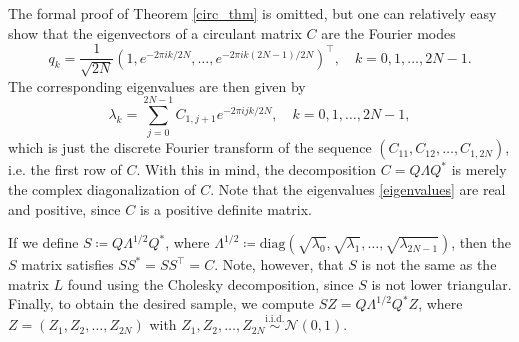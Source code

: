 The formal proof of Theorem \ref{circ_thm} is omitted, but one can relatively easy show that the eigenvectors of a circulant matrix $C$ are the Fourier modes
\begin{equation}
    q_{k}=\frac{1}{\sqrt{2N}}\left(1,e^{-2\pi ik /2N},\dots,e^{-2\pi ik(2N-1)/2N}\right)^{\top},\quad k=0,1,\dots,2N-1.
\end{equation}
The corresponding eigenvalues are then given by
\begin{equation}
    \lambda_{k}=\sum_{j=0}^{2N-1}C_{1,j+1}e^{-2\pi ijk/2N}, \quad k=0,1,\dots,2N-1,
\end{equation}
which is just the discrete Fourier transform of the sequence $(C_{11},C_{12},\dots,C_{1,2N})$, i.e. the first row of $C$. With this in mind, the decomposition $C=Q\Lambda Q^{*}$ is merely the complex diagonalization of $C$.
Note that the eigenvalues \eqref{eigenvalues} are real and positive, since $C$ is a positive definite matrix. 

If we define $S\coloneqq Q \Lambda^{1/2}Q^{*}$, where $\Lambda^{1/2}\coloneqq \textrm{diag}(\sqrt{\lambda_{0}},\sqrt{\lambda_{1}},\dots,\sqrt{\lambda_{2N-1}})$, then the $S$ matrix satisfies $SS^{*}=SS^{\top}=C$. Note, however, that $S$ is not the same as the matrix $L$ found using the Cholesky decomposition, since $S$ is not lower triangular. Finally, to obtain the desired sample, we compute $SZ=Q\Lambda^{1/2}Q^{*}Z$, where $Z=(Z_{1},Z_{2},\dots,Z_{2N})$ with $Z_{1},Z_{2},\dots,Z_{2N}\overset{\textrm{i.i.d.}}{\sim}\mathcal{N}(0,1)$.

